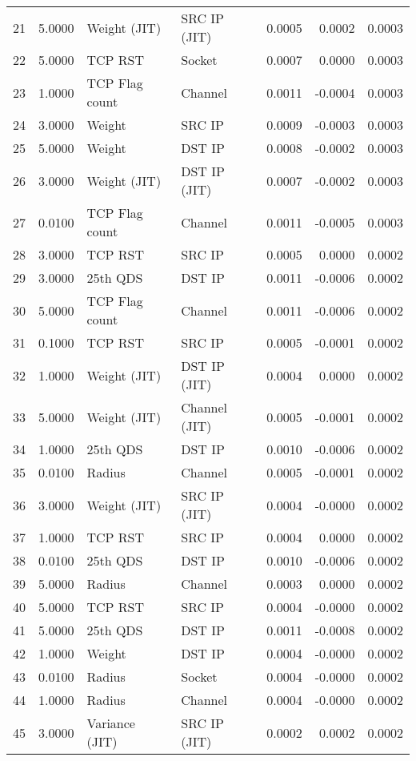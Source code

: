 \begin{longtable}{lrllrrr}
21 & 5.0000 & Weight (JIT) & SRC IP (JIT) & 0.0005 & 0.0002 & 0.0003 \\
22 & 5.0000 & TCP RST & Socket & 0.0007 & 0.0000 & 0.0003 \\
23 & 1.0000 & TCP Flag count & Channel & 0.0011 & -0.0004 & 0.0003 \\
24 & 3.0000 & Weight & SRC IP & 0.0009 & -0.0003 & 0.0003 \\
25 & 5.0000 & Weight & DST IP & 0.0008 & -0.0002 & 0.0003 \\
26 & 3.0000 & Weight (JIT) & DST IP (JIT) & 0.0007 & -0.0002 & 0.0003 \\
27 & 0.0100 & TCP Flag count & Channel & 0.0011 & -0.0005 & 0.0003 \\
28 & 3.0000 & TCP RST & SRC IP & 0.0005 & 0.0000 & 0.0002 \\
29 & 3.0000 & 25th QDS & DST IP & 0.0011 & -0.0006 & 0.0002 \\
30 & 5.0000 & TCP Flag count & Channel & 0.0011 & -0.0006 & 0.0002 \\
31 & 0.1000 & TCP RST & SRC IP & 0.0005 & -0.0001 & 0.0002 \\
32 & 1.0000 & Weight (JIT) & DST IP (JIT) & 0.0004 & 0.0000 & 0.0002 \\
33 & 5.0000 & Weight (JIT) & Channel (JIT) & 0.0005 & -0.0001 & 0.0002 \\
34 & 1.0000 & 25th QDS & DST IP & 0.0010 & -0.0006 & 0.0002 \\
35 & 0.0100 & Radius & Channel & 0.0005 & -0.0001 & 0.0002 \\
36 & 3.0000 & Weight (JIT) & SRC IP (JIT) & 0.0004 & -0.0000 & 0.0002 \\
37 & 1.0000 & TCP RST & SRC IP & 0.0004 & 0.0000 & 0.0002 \\
38 & 0.0100 & 25th QDS & DST IP & 0.0010 & -0.0006 & 0.0002 \\
39 & 5.0000 & Radius & Channel & 0.0003 & 0.0000 & 0.0002 \\
40 & 5.0000 & TCP RST & SRC IP & 0.0004 & -0.0000 & 0.0002 \\
41 & 5.0000 & 25th QDS & DST IP & 0.0011 & -0.0008 & 0.0002 \\
42 & 1.0000 & Weight & DST IP & 0.0004 & -0.0000 & 0.0002 \\
43 & 0.0100 & Radius & Socket & 0.0004 & -0.0000 & 0.0002 \\
44 & 1.0000 & Radius & Channel & 0.0004 & -0.0000 & 0.0002 \\
45 & 3.0000 & Variance (JIT) & SRC IP (JIT) & 0.0002 & 0.0002 & 0.0002 \\

\end{longtable}

